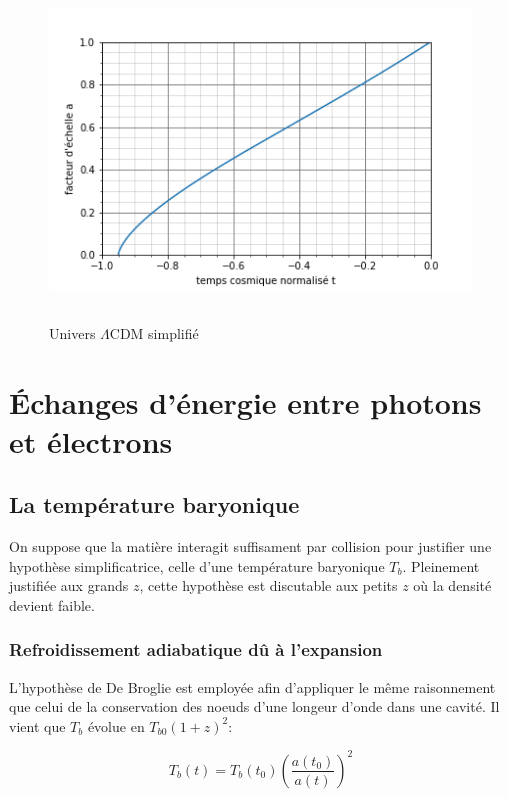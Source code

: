 \documentclass[10pt, a4paper]{report}
\numberwithin{equation}{subsection}
\begin{document}
\begin{figure}[]
\centering
\includegraphics[width=12.0cm,height=9cm]{LCDMf.png}
\caption{Univers $\Lambda$CDM simplifié}
\label{fig:ULCDM}
\end{figure}
 

\section{\uppercase{é}changes d'énergie entre photons et électrons}
\subsection{La température baryonique}
On suppose que la matière interagit suffisament par collision pour justifier une hypothèse simplificatrice, celle d'une température baryonique $T_b$. Pleinement justifiée aux grands $z$, cette hypothèse est discutable aux petits $z$ où la densité devient faible.
\subsubsection{Refroidissement adiabatique dû à l'expansion}
L'hypothèse de De Broglie est employée afin d'appliquer le même raisonnement que celui de la conservation des noeuds d'une longeur d'onde dans une cavité. Il vient que $T_b$ évolue en $T_{b0} (1+z)^2$:

\begin{equation} \label{eq:RTB}
\boxed{T_b(t) = T_b(t_0) \left(\frac{a(t_0)}{a(t)}\right)^2}
\end{equation}
\end{document}
